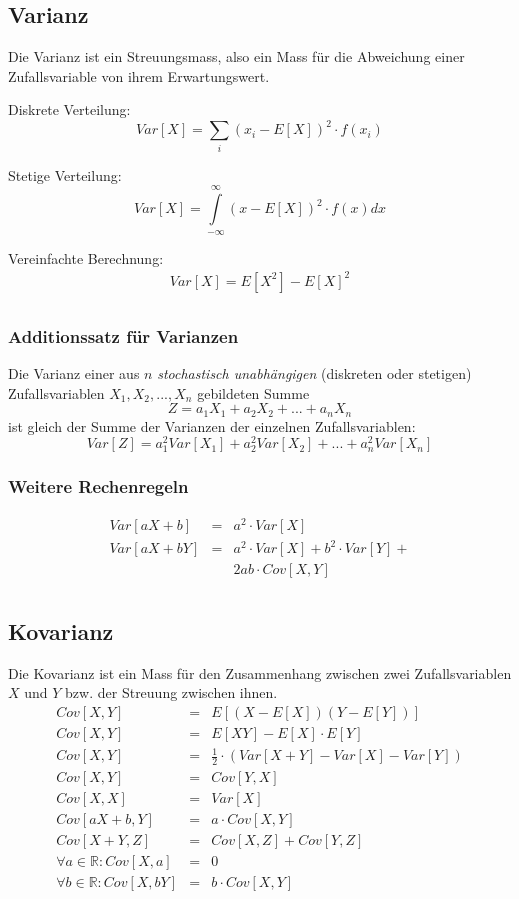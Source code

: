 \documentclass[10pt,a4paper,twocolumn]{article}
\begin{document}
\subsection{Varianz}
Die Varianz ist ein Streuungsmass, also ein Mass für die Abweichung einer Zufallsvariable von ihrem Erwartungswert.

\vspace{10pt}

Diskrete Verteilung:
\[
Var[X]=\sum\limits_{i}(x_i-E[X])^2\cdot f(x_i)
\]

Stetige Verteilung:
\[
Var[X]=\int\limits_{-\infty}^{\infty}(x-E[X])^2\cdot f(x)dx
\]

Vereinfachte Berechnung:
\[
\begin{array}{c}
	Var[X] = E[X^2] - E[X]^2 \\
\end{array}
\]

\subsubsection{Additionssatz für Varianzen}
Die Varianz einer aus $n$ \emph{stochastisch unabhängigen} (diskreten oder stetigen) Zufallsvariablen $X_1,X_2,...,X_n$ gebildeten Summe
\[
Z=a_1X_1+a_2X_2+...+a_nX_n
\]
ist gleich der Summe der Varianzen der einzelnen Zufallsvariablen:
\[
Var[Z]=a_1^2Var[X_1]+a_2^2Var[X_2]+...+a_n^2Var[X_n]
\]

\subsubsection{Weitere Rechenregeln}
\[
\begin{array}{rcl}
	Var[aX + b] & = & a^2 \cdot Var[X] \\
	Var[aX + bY] & = & a^2 \cdot Var[X] + b^2 \cdot Var[Y] + \\
	& &  2ab \cdot Cov[X,Y] \\
\end{array}	
\]

\subsection{Kovarianz}
Die Kovarianz ist ein Mass für den Zusammenhang zwischen zwei Zufallsvariablen $X$ und $Y$ bzw. der Streuung zwischen ihnen.
\[
\begin{array}{rcl}
	Cov[X,Y] & = & E[(X - E[X])(Y - E[Y])] \\
	Cov[X,Y] & = & E[XY] - E[X] \cdot E[Y] \\
	Cov[X,Y] & = & \frac{1}{2} \cdot \left(Var[X + Y] - Var[X] - Var[Y] \right)	\\
	Cov[X,Y] &= & Cov[Y,X] \\
	Cov[X,X] & = & Var[X] \\
	Cov[aX + b,Y] & = & a \cdot Cov[X,Y] \\
	Cov[X + Y,Z] & = & Cov[X,Z] + Cov[Y,Z] \\
	\forall a \in \mathbb{R}: Cov[X,a] & = & 0 \\
	\forall b \in \mathbb{R}: Cov[X,bY] & = & b \cdot Cov[X,Y] \\
\end{array}
\]
\end{document}
